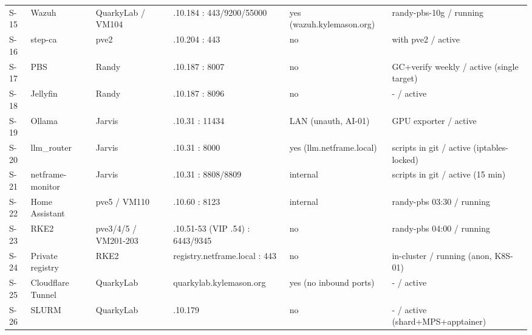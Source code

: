 {\begin{longtable}{p{0.9cm}p{2.5cm}p{2.1cm}p{2.7cm}p{2.6cm}p{3.4cm}}
S-15 & Wazuh & QuarkyLab / VM104 & .10.184 : 443/9200/55000 & yes (wazuh.kylemason.org) & randy-pbs-10g / running \\
S-16 & step-ca & pve2 & .10.204 : 443 & no & with pve2 / active \\
S-17 & PBS & Randy & .10.187 : 8007 & no & GC+verify weekly / active (single target) \\
S-18 & Jellyfin & Randy & .10.187 : 8096 & no & - / active \\
S-19 & Ollama & Jarvis & .10.31 : 11434 & LAN (unauth, AI-01) & GPU exporter / active \\
S-20 & llm\_router & Jarvis & .10.31 : 8000 & yes (llm.netframe.local) & scripts in git / active (iptables-locked) \\
S-21 & netframe-monitor & Jarvis & .10.31 : 8808/8809 & internal & scripts in git / active (15 min) \\
S-22 & Home Assistant & pve5 / VM110 & .10.60 : 8123 & internal & randy-pbs 03:30 / running \\
S-23 & RKE2 & pve3/4/5 / VM201-203 & .10.51-53 (VIP .54) : 6443/9345 & no & randy-pbs 04:00 / running \\
S-24 & Private registry & RKE2 & registry.netframe.local : 443 & no & in-cluster / running (anon, K8S-01) \\
S-25 & Cloudflare Tunnel & QuarkyLab & quarkylab.kylemason.org & yes (no inbound ports) & - / active \\
S-26 & SLURM & QuarkyLab & .10.179 & no & - / active (shard+MPS+apptainer) \\
\bottomrule
\end{longtable}}
